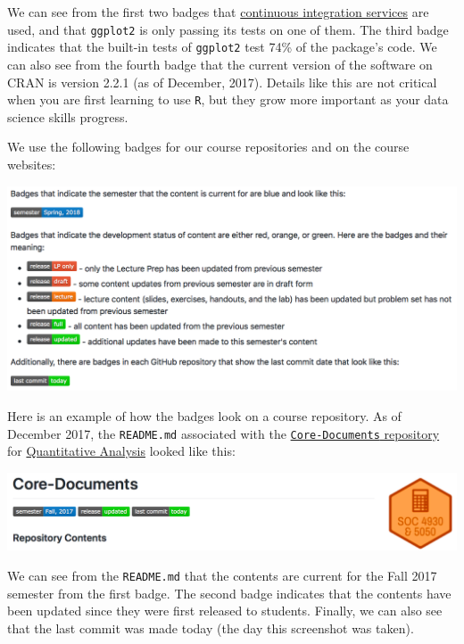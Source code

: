 \documentclass[]{book}
\theoremstyle{definition}
\theoremstyle{definition}
\theoremstyle{definition}
\theoremstyle{remark}
\begin{document}
We can see from the first two badges that
\href{https://en.wikipedia.org/wiki/Continuous_integration}{continuous
integration services} are used, and that \texttt{ggplot2} is only
passing its tests on one of them. The third badge indicates that the
built-in tests of \texttt{ggplot2} test 74\% of the package's code. We
can also see from the fourth badge that the current version of the
software on CRAN is version 2.2.1 (as of December, 2017). Details like
this are not critical when you are first learning to use \texttt{R}, but
they grow more important as your data science skills progress.

We use the following badges for our course repositories and on the
course websites:

\begin{center}\includegraphics[width=0.95\linewidth]{images/readmeBadges} \end{center}

Here is an example of how the badges look on a course repository. As of
December 2017, the \texttt{README.md} associated with the
\href{https://github.com/slu-soc5050/Core-Documents}{\texttt{Core-Documents}
repository} for \href{https://slu-soc5050.github.io}{Quantitative
Analysis} looked like this:

\begin{center}\includegraphics[width=0.95\linewidth]{images/readmeBadgesEx} \end{center}

We can see from the \texttt{README.md} that the contents are current for
the Fall 2017 semester from the first badge. The second badge indicates
that the contents have been updated since they were first released to
students. Finally, we can also see that the last commit was made today
(the day this screenshot was taken).
\end{document}
